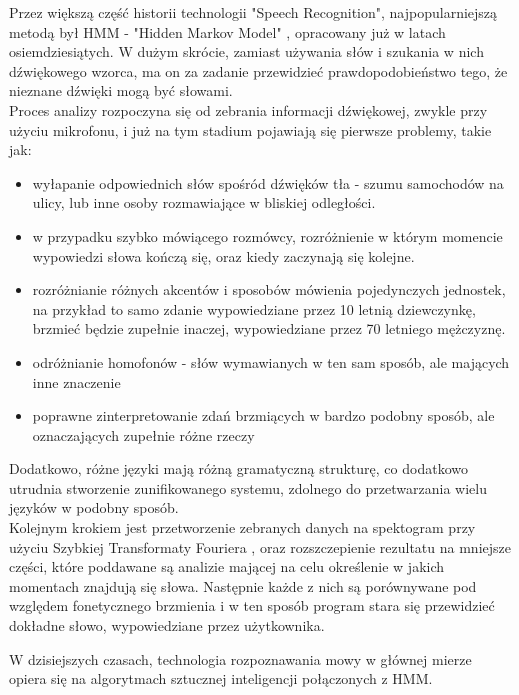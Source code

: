 \documentclass[12pt, a4paper]{article}
\begin{document}
\begin{sloppypar}
{{    Przez większą część historii technologii "Speech Recognition", 
    najpopularniejszą metodą był HMM - "Hidden Markov Model" \cite{markov_article},
    opracowany już w latach osiemdziesiątych. W dużym skrócie, zamiast używania 
    słów i szukania w nich dźwiękowego wzorca, ma on za zadanie przewidzieć
    prawdopodobieństwo tego, że nieznane dźwięki mogą być słowami.\\   
    Proces analizy rozpoczyna się od zebrania informacji dźwiękowej,
    zwykle przy użyciu mikrofonu, i już na tym stadium pojawiają się pierwsze 
    problemy, takie jak:
    \begin{itemize}
      \item wyłapanie odpowiednich słów spośród dźwięków tła - szumu samochodów na 
      ulicy, lub inne osoby rozmawiające w bliskiej odległości.
      \item w przypadku szybko mówiącego rozmówcy, rozróżnienie w którym momencie
      wypowiedzi słowa kończą się, oraz kiedy zaczynają się kolejne.
      \item rozróżnianie różnych akcentów i sposobów mówienia pojedynczych jednostek,
      na przykład to samo zdanie wypowiedziane przez 10 letnią dziewczynkę, brzmieć
      będzie zupełnie inaczej, wypowiedziane przez 70 letniego mężczyznę. 
      \item odróżnianie homofonów - słów wymawianych w ten sam sposób, ale mających
      inne znaczenie
      \item poprawne zinterpretowanie zdań brzmiących w bardzo podobny sposób, ale
      oznaczających zupełnie różne rzeczy
    \end{itemize} 
    Dodatkowo, różne języki mają różną gramatyczną strukturę, co dodatkowo utrudnia
    stworzenie zunifikowanego systemu, zdolnego do przetwarzania wielu języków w 
    podobny sposób.\\
    Kolejnym krokiem jest przetworzenie zebranych danych na spektogram przy użyciu
    Szybkiej Transformaty Fouriera \cite{fourier}, oraz rozszczepienie
    rezultatu na mniejsze części, które poddawane są analizie mającej na celu
    określenie w jakich momentach znajdują się słowa. Następnie każde z nich są
    porównywane pod względem fonetycznego brzmienia i w ten sposób program stara
    się przewidzieć dokładne słowo, wypowiedziane przez użytkownika.

    W dzisiejszych czasach, technologia rozpoznawania mowy w głównej mierze opiera
    się na algorytmach sztucznej inteligencji połączonych z HMM.
  }
}
\end{sloppypar}
\end{document}
